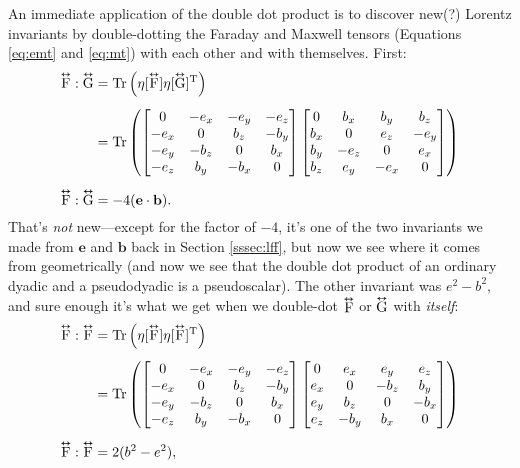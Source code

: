 \documentclass[12pt]{article}
\renewcommand{\vv}[1]{\mathbf{#1}}
\newcommand{\tightoverset}[2]{%
  \mathop{#2}\limits^{\vbox to -.5ex{\kern-0.75ex\hbox{$#1$}\vss}}}
\newcommand{\inlinedy}[1]{\tightoverset{\text{\tiny$\bm\leftrightarrow$}}{#1}}
\newcommand{\capdy}[1]{ \overset{ \text{\tiny$\bm\leftrightarrow$} }{\vphantom{\text{\small{A}}}\smash{#1}} }
\begin{document}
An immediate application of the double dot product is to discover new(?) Lorentz invariants by double-dotting the Faraday and Maxwell tensors (Equations \ref{eq:emt} and \ref{eq:mt}) with each other and with themselves. First:
\begin{equation}\label{eq:fddg}
\begin{split}
\capdy{\mathrm{F}} : \capdy{\mathrm{G}} &= \mathrm{Tr} \left( \eta [ \capdy{\mathrm{F}} ] \eta [ \capdy{\mathrm{G}} ]^{\mathrm{T}} \right) \\[5pt]
&=
\mathrm{Tr}
\left(
\begin{bmatrix}
0 & -e_x & -e_y & -e_z \\
-e_x & 0 & b_z & -b_y \\
-e_y & -b_z & 0 & b_x \\
-e_z & b_y & -b_x & 0
\end{bmatrix}
\begin{bmatrix}
0 & b_x & b_y & b_z \\
b_x & 0 & e_z & -e_y \\
b_y & -e_z & 0 & e_x \\
b_z & e_y & -e_x & 0
\end{bmatrix}
\right) \\[5pt]
\capdy{\mathrm{F}} : \capdy{\mathrm{G}} &= -4 (\vv e \cdot \vv b).
\end{split}
\end{equation}
That's \emph{not} new---except for the factor of $-4$, it's one of the two invariants we made from $\vv e$ and $\vv b$ back in Section \ref{sssec:lff}, but now we see where it comes from geometrically (and now we see that the double dot product of an ordinary dyadic and a pseudodyadic is a pseudoscalar). The other invariant was $e^2 - b^2$, and sure enough it's what we get when we double-dot $\inlinedy{\mathrm{F}}$ or $\inlinedy{\mathrm{G}}$ with \emph{itself}:
\begin{equation}\label{eq:fddf}
\begin{split}
\capdy{\mathrm{F}} : \capdy{\mathrm{F}} &= \mathrm{Tr} \left( \eta [ \capdy{\mathrm{F}} ] \eta [ \capdy{\mathrm{F}} ]^{\mathrm{T}} \right) \\[5pt]
&=
\mathrm{Tr}
\left(
\begin{bmatrix}
0 & -e_x & -e_y & -e_z \\
-e_x & 0 & b_z & -b_y \\
-e_y & -b_z & 0 & b_x \\
-e_z & b_y & -b_x & 0
\end{bmatrix}
\begin{bmatrix}
0 & e_x & e_y & e_z \\
e_x & 0 & -b_z & b_y \\
e_y & b_z & 0 & -b_x \\
e_z & -b_y & b_x & 0
\end{bmatrix}
\right) \\[5pt]
\capdy{\mathrm{F}} : \capdy{\mathrm{F}} &= 2(b^2 - e^2),
\end{split}
\end{equation}
\end{document}
